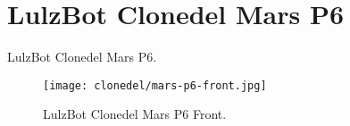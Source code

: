 %
%
%
%
%

\section{LulzBot Clonedel Mars P6}
LulzBot Clonedel Mars P6.

\begin{figure}[h!]
\texttt{[image: clonedel/mars-p6-front.jpg]}
 \caption{LulzBot Clonedel Mars P6 Front.}
 \label{fig:clonedel-mars-p6-front}
\end{figure}


